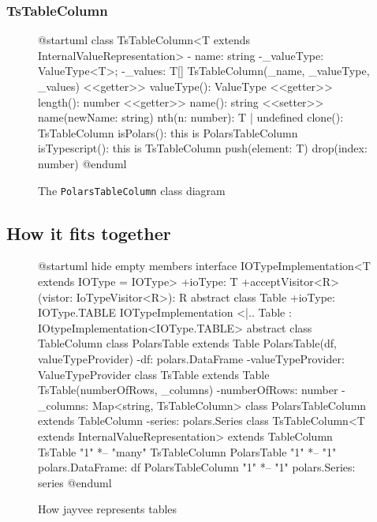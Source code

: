 \subsubsection{TsTableColumn}
\begin{figure}
	\begin{plantuml}
		@startuml
		class TsTableColumn<T extends InternalValueRepresentation> {
				- name: string
				-_valueType: ValueType<T>;
				-_values: T[]
				TsTableColumn(_name, _valueType, _values)
				<<getter>> valueType(): ValueType
				<<getter>> length(): number
				<<getter>> name(): string
				<<setter>> name(newName: string)
				nth(n: number): T | undefined
				clone(): TsTableColumn
				isPolars(): this is PolarsTableColumn
				isTypescript(): this is TsTableColumn
				push(element: T)
				drop(index: number)
			}
		@enduml
	\end{plantuml}
	\caption{The \Verb|PolarsTableColumn| class diagram}
	\label{fig:uml:tstablecolumn}
\end{figure}

\subsection{How it fits together}
\begin{figure}
	\begin{plantuml}
		@startuml
		hide empty members
		interface IOTypeImplementation<T extends IOType = IOType> {
				+ioType: T
				+acceptVisitor<R>(vistor: IoTypeVisitor<R>): R
			}
		abstract class Table {
				+ioType: IOType.TABLE
			}
		IOTypeImplementation <|.. Table : IOtypeImplementation<IOType.TABLE>
		abstract class TableColumn {
			}
		class PolarsTable extends Table {
				PolarsTable(df, valueTypeProvider)
				-df: polars.DataFrame
				-valueTypeProvider: ValueTypeProvider
			}
		class TsTable extends Table {
				TsTable(numberOfRows, _columns)
				-numberOfRows: number
				-_columns: Map<string, TsTableColumn>
			}
		class PolarsTableColumn extends TableColumn {
				-series: polars.Series
			}
		class TsTableColumn<T extends InternalValueRepresentation> extends TableColumn {
			}
		TsTable "1" *-- "many" TsTableColumn
		PolarsTable "1" *-- "1" polars.DataFrame: df
		PolarsTableColumn "1" *-- "1" polars.Series: series
		@enduml
	\end{plantuml}
	\caption{How jayvee represents tables} %
	\label{fig:current_sit}
\end{figure}

